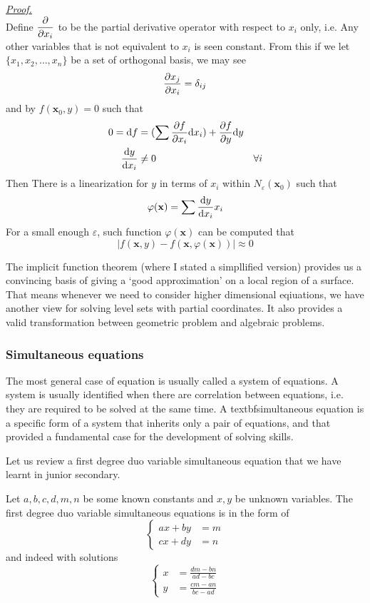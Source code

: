 \documentclass[12pt]{article}
\renewenvironment{proof}[1][Proof]{\begin{snugshade*} \underline{\textit{{#1}.}}\\}{\hfill \qedsymbol \end{snugshade*}}
\begin{document}
    \begin{proof}
        Define $\displaystyle \partialderivative{x_i}$ to be the partial derivative operator with respect to $x_i$ only, i.e. Any other variables that is not equivalent to $x_i$ is seen constant. From this if we let $\{x_1,x_2,\dots,x_n\}$ be a set of orthogonal basis, we may see \begin{align*}
            \partialderivative{x_j}{x_i}=\delta_{ij}
        \end{align*} and by $f(\mathbf{x}_0,y)=0$ such that \begin{align*}
            0=\mathrm{d}f&=(\sum \partialderivative{f}{x_i}\mathrm{d}x_i) + \partialderivative{f}{y}\mathrm{d}y\\
            \derivative{y}{x_i}&\neq 0&\forall i
        \end{align*}
        Then There is a linearization for $y$ in terms of $x_i$ within $N_{\varepsilon}(\mathbf{x}_0)$ such that \[\varphi(\mathbf{x})=\sum \derivative{y}{x_i}x_i\]
        For a small enough $\varepsilon$, such function $\varphi(\mathbf{x})$ can be computed that \[|f(\mathbf{x},y)-f(\mathbf{x},\varphi(\mathbf{x}))|\approx 0\]
    \end{proof}

    The implicit function theorem (where I stated a simpllified version) provides us a convincing basis of giving a `good approximation' on a local region of a surface. That means whenever we need to consider higher dimensional eqiuations, we have another view for solving level sets with partial coordinates. It also provides a valid transformation between geometric problem and algebraic problems.

    \subsubsection*{Simultaneous equations}

    The most general case of equation is usually called a system of equations. A system is usually identified when there are correlation between equations, i.e. they are required to be solved at the same time. A textbf{simultaneous equation} is a specific form of a system that inherits only a pair of equations, and that provided a fundamental case for the development of solving skills.

    Let us review a first degree duo variable simultaneous equation that we have learnt in junior secondary.

    Let $a,b,c,d,m,n$ be some known constants and $x,y$ be unknown variables. The first degree duo variable simultaneous equations is in the form of \[\begin{cases}
        ax+by&=m\\
        cx+dy&=n
    \end{cases}\]
    and indeed with solutions \[\begin{cases}
        x&=\displaystyle \frac{dm-bn}{ad-bc}\\
        y&=\displaystyle \frac{cm-an}{bc-ad}
    \end{cases}\]
\end{document}
